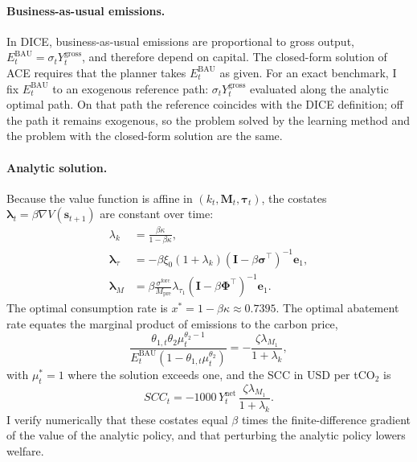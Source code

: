 \paragraph{Business-as-usual emissions.} In DICE, business-as-usual emissions are proportional to gross output, \(E^{\text{BAU}}_t = \sigma_t Y^{\text{gross}}_t\), and therefore depend on capital. The closed-form solution of ACE requires that the planner takes \(E^{\text{BAU}}_t\) as given. For an exact benchmark, I fix \(E^{\text{BAU}}_t\) to an exogenous reference path: \(\sigma_t Y^{\text{gross}}_t\) evaluated along the analytic optimal path. On that path the reference coincides with the DICE definition; off the path it remains exogenous, so the problem solved by the learning method and the problem with the closed-form solution are the same.

\paragraph{Analytic solution.} Because the value function is affine in \((k_t, \bm{M}_t, \bm{\tau}_t)\), the costates \(\bm{\lambda}_t = \beta \nabla V(\bm{s}_{t+1})\) are constant over time:
\begin{align}
    \lambda_k &= \frac{\beta\kappa}{1-\beta\kappa}, \\
    \bm{\lambda}_\tau &= -\beta\xi_0(1+\lambda_k)\left(\bm{I} - \beta\bm{\sigma}^\top\right)^{-1}\bm{e}_1, \\
    \bm{\lambda}_M &= \beta\frac{\sigma^{\text{forc}}}{M_{\text{pre}}}\lambda_{\tau_1}\left(\bm{I} - \beta\bm{\Phi}^\top\right)^{-1}\bm{e}_1 .
\end{align}
The optimal consumption rate is \(x^* = 1 - \beta\kappa \approx 0.7395\). The optimal abatement rate equates the marginal product of emissions to the carbon price,
\begin{equation}
    \frac{\theta_{1,t}\theta_2 \mu_t^{\theta_2 - 1}}{E^{\text{BAU}}_t\left(1 - \theta_{1,t}\mu_t^{\theta_2}\right)} = -\frac{\zeta\lambda_{M_1}}{1+\lambda_k},
\end{equation}
with \(\mu^*_t = 1\) where the solution exceeds one, and the SCC in USD per tCO\(_2\) is
\begin{equation}
    SCC_t = -1000\, Y^{\text{net}}_t\, \frac{\zeta \lambda_{M_1}}{1 + \lambda_k}.
    \label{eq:scc}
\end{equation}
I verify numerically that these costates equal \(\beta\) times the finite-difference gradient of the value of the analytic policy, and that perturbing the analytic policy lowers welfare.
